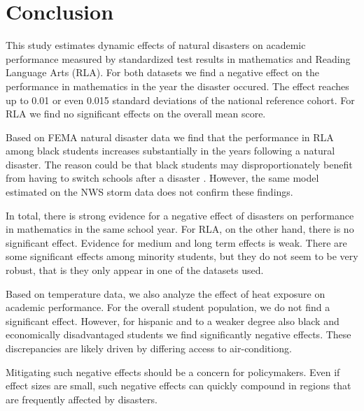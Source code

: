 \section{Conclusion} \label{Conclusion}

This study estimates dynamic effects of natural disasters on academic performance measured by standardized test results in mathematics and Reading Language Arts (RLA). For both datasets we find a negative effect on the performance in mathematics in the year the disaster occured. The effect reaches up to 0.01 or even 0.015 standard deviations of the national reference cohort. For RLA we find no significant effects on the overall mean score.

Based on FEMA natural disaster data we find that the performance in RLA among black students increases substantially in the years following a natural disaster. The reason could be that black students may disproportionately benefit from having to switch schools after a disaster \citep{Sacerdote_2012}. However, the same model estimated on the NWS storm data does not confirm these findings.

In total, there is strong evidence for a negative effect of disasters on performance in mathematics in the same school year. For RLA, on the other hand, there is no significant effect. Evidence for medium and long term effects is weak.  There are some significant effects among minority students, but they do not seem to be very robust, that is they only appear in one of the datasets used.

Based on temperature data, we also analyze the effect of heat exposure on academic performance. For the overall student population, we do not find a significant effect. However, for hispanic and to a weaker degree also black and economically disadvantaged students we find significantly negative effects. These discrepancies are likely driven by differing access to air-conditiong.

Mitigating such negative effects should be a concern for policymakers. Even if effect sizes are small, such negative effects can quickly compound in regions that are frequently affected by disasters. 




